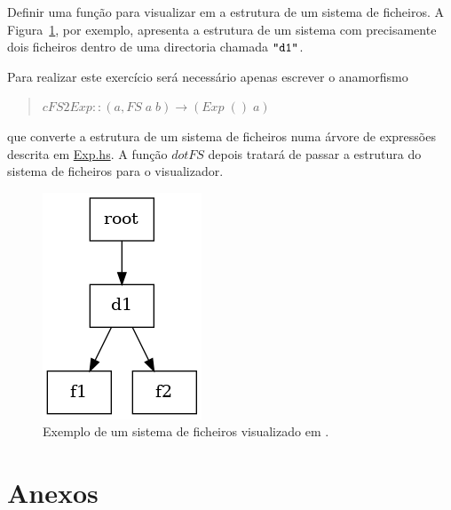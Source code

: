 \documentclass[a4paper]{article}
\newcommand{\Conid}[1]{\mathit{#1}}
\newcommand{\Varid}[1]{\mathit{#1}}
\begin{document}
Definir uma função para visualizar em 
a estrutura de um sistema de ficheiros. A Figura~\ref{ex_prob1}, por exemplo,
apresenta a estrutura de um sistema com precisamente dois ficheiros dentro
de uma directoria chamada \ensuremath{\text{\ttfamily \char34 d1\char34}}. 

Para realizar este exercício será necessário apenas  escrever o anamorfismo
\begin{quote}
\ensuremath{\Varid{cFS2Exp}\mathbin{::}(\Varid{a},\Conid{FS}\;\Varid{a}\;\Varid{b})\to (\Conid{Exp}\;()\;\Varid{a})} 
\end{quote}
que converte a estrutura de um sistema de ficheiros numa árvore de expressões
descrita em \href{http://wiki.di.uminho.pt/twiki/pub/Education/CP/MaterialPedagogico/Exp.hs}{Exp.hs}.
A função \ensuremath{\Varid{dotFS}} depois tratará de passar a estrutura do sistema de ficheiros para o visualizador.
\begin{figure}
\centering
\includegraphics[scale=0.5]{cp1819t_media/fs.png}
\caption{Exemplo de um sistema de ficheiros visualizado em .}
\label{ex_prob1}
\end{figure}


\newpage

\part*{Anexos}

\appendix
\end{document}
